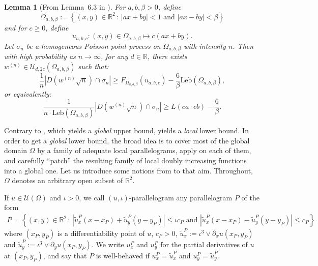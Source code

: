 \documentclass{article}
\newtheorem{lem}[theorem]{Lemma}
\theoremstyle{remark}
\def\R{\mathbb{R}}
\newcommand{\card}[1]{\left|#1\right|}
\def\Leb{\mathrm{Leb}}
\def\Usjo{\mathcal{U}}
\begin{document}
\begin{lem}[From Lemma~6.3 in \cite{S23}]\label{lem: F serves as a local lower bound}
    For $a,b,\beta>0$, define
    \[
        \Omega_{a,b,\beta} := \left\{ (x,y)\in\R^2 \,:\, \card{ax+by}<1 \text{ and } \card{ax-by}<\beta \right\} 
    \]
    and for $c\ge0$, define 
    \[
        u_{a,b,c} : (x,y)\in \Omega_{a,b,\beta} \mapsto c(ax+by) .
    \]
    Let $\sigma_n$ be a homogeneous Poisson point process on $\Omega_{a,b,\beta}$ with intensity $n$.
    Then with high probability as $n\to\infty$, for any $d\in\R$, there exists $w^{(n)} \in \Usjo_{d,2c}(\Omega_{a,b,\beta})$ such that:
    \[
        \frac{1}{n} \card{ D\left( w^{(n)}\sqrt n \right) \cap \sigma_n } \ge F_{\Omega_{a,b,\beta}}\left( u_{a,b,c} \right) - \frac6\beta \Leb\left( \Omega_{a,b,\beta} \right) ,
    \]
    or equivalently:
    \[
        \frac{1}{n \cdot \Leb\left( \Omega_{a,b,\beta} \right)} \card{ D\left( w^{(n)}\sqrt n \right) \cap \sigma_n } \ge L\left( ca \cdot cb \right) - \frac6\beta .
    \]
\end{lem}

Contrary to , which yields a \textit{global} upper bound,  yields a \textit{local} lower bound.
In order to get a \textit{global} lower bound, the broad idea is to cover most of the global domain $\Omega$ by a family of adequate local parallelograms, apply  on each of them, and carefully ``patch'' the resulting family of local doubly increasing functions into a global one.
Let us introduce some notions from \cite{S23} to that aim.
Throughout, $\Omega$ denotes an arbitrary open subset of $\R^2$.

If $u\in\Usjo(\Omega)$ and $\iota>0$, we call $(u,\iota)$-parallelogram any parallelogram $P$ of the form
\begin{align*}
    P = \left\{ (x,y)\in\R^2 \,:\, 
    \card{ \widetilde u_x^P (x-x_P) + \widetilde u_y^P (y-y_P) } \le \iota c_P \text{ and }
    \card{ \widetilde u_x^P (x-x_P) - \widetilde u_y^P (y-y_P) } \le c_P 
    \right\}
\end{align*}
where $(x_P,y_P)$ is a differentiability point of $u$, $c_P>0$, $\widetilde u_x^P := \iota^3 \vee \partial_x u (x_P,y_P)$ and $\widetilde u_y^P := \iota^3 \vee \partial_y u (x_P,y_P)$.
We write $u_x^P$ and $u_y^P$ for the partial derivatives of $u$ at $(x_P,y_P)$, and say that $P$ is well-behaved if $u_x^P = \widetilde u_x^P$ and $u_y^P = \widetilde u_y^P$.
\end{document}
